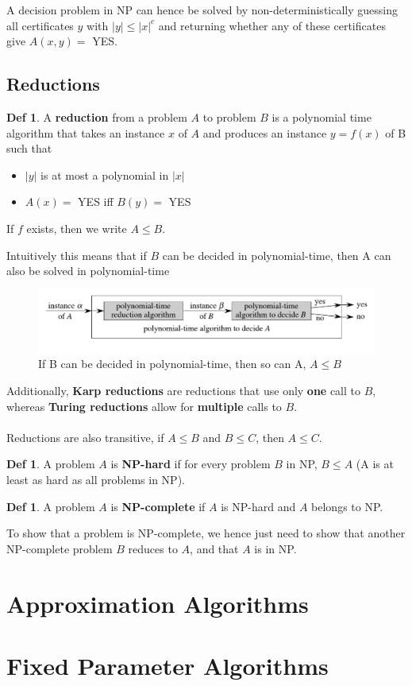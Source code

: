\documentclass{article}
\theoremstyle{plain}
\theoremstyle{definition}
\newtheorem{defn}[dummy]{Def}
\begin{document}
    A decision problem in NP can hence be solved by non-deterministically guessing all certificates $y$ with $|y| \leq |x|^c$ and returning whether any of these certificates give $A(x,y) = $ YES. 

    \subsection{Reductions}
        \begin{defn}
            A \textbf{reduction} from a problem $A$ to problem $B$ is a polynomial time algorithm that takes an instance $x$ of $A$ and produces an instance $y = f(x)$ of B such that
            \begin{itemize}
                \item $|y|$ is at most a polynomial in $|x|$
                \item $A(x) = $ YES iff $B(y) = $ YES
            \end{itemize}    
            If $f$ exists, then we write $A \leq B$. 
        \end{defn}
        Intuitively this means that if $B$ can be decided in polynomial-time, then A can also be solved in polynomial-time
        \begin{figure}[H]
            \centering
            \includegraphics[width=\linewidth]{images/reduction.png}
            \caption{If B can be decided in polynomial-time, then so can A, $A \leq B$}
            \label{fig:reduction}
        \end{figure}
        Additionally, \textbf{Karp reductions} are reductions that use only \textbf{one} call to $B$, whereas \textbf{Turing reductions} allow for \textbf{multiple} calls to $B$. \\ \\ 
        Reductions are also transitive, if $A \leq B$ and $B \leq C$, then $A \leq C$. 
        \begin{defn}
            A problem $A$ is \textbf{NP-hard} if for every problem $B$ in NP, $B \leq A$ (A is at least as hard as all problems in NP). 
        \end{defn}
        \begin{defn}
            A problem $A$ is \textbf{NP-complete} if $A$ is NP-hard and $A$ belongs to NP. 
        \end{defn}
        To show that a problem is NP-complete, we hence just need to show that another NP-complete problem $B$ reduces to $A$, and that $A$ is in NP. 
\section{Approximation Algorithms}
\section{Fixed Parameter Algorithms}
\end{document}
